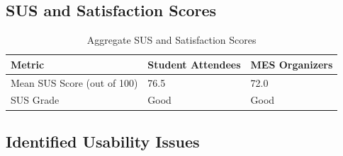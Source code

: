 \documentclass[12pt, titlepage]{article}
\begin{document}
\subsection{SUS and Satisfaction Scores}


\begin{table}[H]
\centering
\caption{Aggregate SUS and Satisfaction Scores}
\begin{tabularx}{\textwidth}{Xp{4cm}p{4cm}}
\toprule
\textbf{Metric} & \textbf{Student Attendees} & \textbf{MES Organizers} \\
\midrule
Mean SUS Score (out of 100) & 76.5 & 72.0 \\
SUS Grade & Good & Good \\
\bottomrule
\end{tabularx}
\end{table}


\subsection{Identified Usability Issues}
\end{document}
